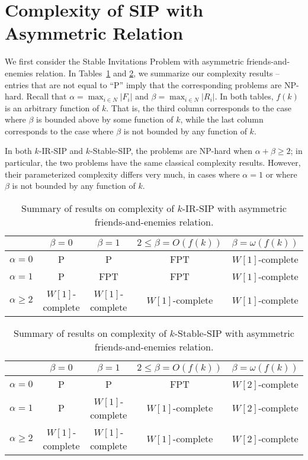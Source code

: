 \section{Complexity of SIP with Asymmetric Relation} \label{sec:SIP:asymmetric}

We first consider the Stable Invitations Problem with asymmetric friends-and-enemies relation.
In Tables~\ref{tbl:SIP:summary_asymmetric_IR} and \ref{tbl:SIP:summary_asymmetric_stable}, we summarize our complexity results -- entries that are not equal to ``P'' imply that the corresponding problems are NP-hard. 
Recall that $\alpha = \max_{i\in N} |F_i|$ and $\beta = \max_{i\in N} |R_i|$.
In both tables, $f(k)$ is an arbitrary function of $k$. 
That is, the third column corresponds to the case where $\beta$ is bounded above by some function of $k$, while the last column corresponds to the case where $\beta$ is not bounded by any function of $k$. 

In both $k$-IR-SIP and $k$-Stable-SIP, the problems are NP-hard when $\alpha + \beta \geq 2$; in particular, the two problems have the same classical complexity results.
However, their parameterized complexity differs very much, in cases where $\alpha = 1$ or where $\beta$ is not bounded by any function of $k$. 

\begin{table}[h!]
	\centering
\begin{tabular}{|*{5}{c|}}\hline
	 			& $\beta = 0$ 	& $\beta = 1$ 	& $ 2 \leq \beta = O(f(k))$ 	&$\beta = \omega(f(k))$ \\ \hline
$\alpha = 0$ 	& P			  	& P				& FPT 				   	& $W[1]$-complete \\ \hline
$\alpha = 1$ 	& P			  	& FPT			& FPT 				   	& $W[1]$-complete \\ \hline
$\alpha \geq 2$ & $W[1]$-complete	& $W[1]$-complete & $W[1]$-complete 		& $W[1]$-complete \\ \hline
\end{tabular}
\caption{Summary of results on complexity of $k$-IR-SIP with asymmetric friends-and-enemies relation.}
\label{tbl:SIP:summary_asymmetric_IR}
\end{table}

\begin{table}[h!]
	\centering
\begin{tabular}{|*{5}{c|}}\hline
	 			& $\beta = 0$ 	& $\beta = 1$ 	& $ 2 \leq \beta = O(f(k))$ 	&$\beta = \omega(f(k))$ \\ \hline
$\alpha = 0$ 	& P			  	& P				& FPT 				   	& $W[2]$-complete \\ \hline
$\alpha = 1$ 	& P			  	& $W[1]$-complete			& $W[1]$-complete				   	& $W[2]$-complete \\ \hline
$\alpha \geq 2$ & $W[1]$-complete	& $W[1]$-complete & $W[1]$-complete 		& $W[2]$-complete \\ \hline
\end{tabular}
\caption{Summary of results on complexity of $k$-Stable-SIP with asymmetric friends-and-enemies relation.}
\label{tbl:SIP:summary_asymmetric_stable}
\end{table}

